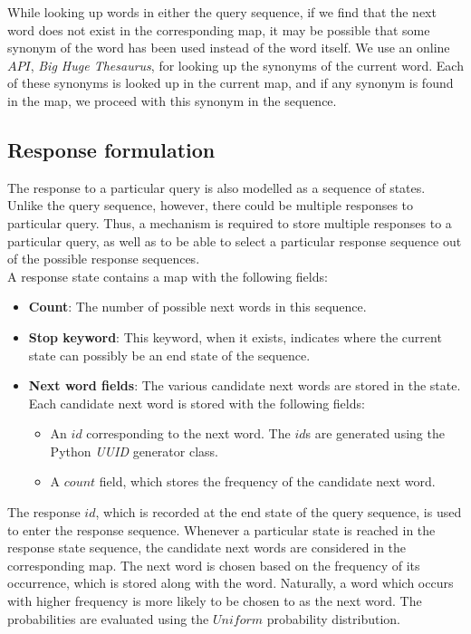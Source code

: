 \documentclass[12pt,a4paper]{article}
\begin{document}
While looking up words in either the query sequence, if we find that the next word does not exist in the corresponding map, it may be possible that some synonym of the word has been used instead of the word itself. We use an online $API$, \textit{Big Huge Thesaurus}, for looking up the synonyms of the current word. Each of these synonyms is looked up in the current map, and if any synonym is found in the map, we proceed with this synonym in the sequence.

\subsection{Response formulation}
The response to a particular query is also modelled as a sequence of states. Unlike the query sequence, however, there could be multiple responses to  particular query. Thus, a mechanism is required to store multiple responses to a particular query, as well as to be able to select a particular response sequence out of the possible response sequences.\\

A response state contains a map with the following fields:

\begin{itemize}
\item \textbf{Count}: The number of possible next words in this sequence.

\item \textbf{Stop keyword}: This keyword, when it exists, indicates where the current state can possibly be an end state of the sequence.

\item \textbf{Next word fields}: The various candidate next words are stored in the state. Each candidate next word is stored with the following fields:
\begin{itemize}
\item An $id$ corresponding to the next word. The $id$s are generated using the Python \textit{UUID} generator class.
\item A $count$ field, which stores the frequency of the candidate next word.
\end{itemize}
\end{itemize}

The response $id$, which is recorded at the end state of the query sequence, is used to enter the response sequence. Whenever a particular state is reached in the response state sequence, the candidate next words are considered in the corresponding map. The next word is chosen based on the frequency of its occurrence, which is stored along with the word. Naturally, a word which occurs with higher frequency is more likely to be chosen to as the next word. The probabilities are evaluated using the $Uniform$ probability distribution.\\
\end{document}
